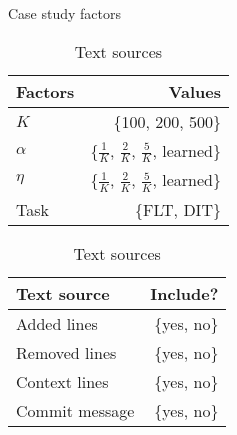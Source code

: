 \begin{table}
\begin{spacing}{1.2}
\centering
\parbox{.45\linewidth}{
\centering
\caption{Case study factors}
\label{table:combo-rq1}
\begin{tabular}{lr}
\toprule
Factors           &  Values  \\
\midrule
$K$             &  \{100, 200, 500\} \\
$\alpha$      &  \{$\frac{1}{K}$, $\frac{2}{K}$, $\frac{5}{K}$, learned\} \\
$\eta$      &  \{$\frac{1}{K}$, $\frac{2}{K}$, $\frac{5}{K}$, learned\} \\
Task      &  \{FLT, DIT\} \\
\bottomrule
\end{tabular}
}
\hfill
\parbox{.45\linewidth}{
\centering
\caption{Text sources}
\vspace{0.2em}
\label{table:combo-rq2}
\begin{tabular}{lr}
\toprule
Text source   &  Include? \\
\midrule
Added lines   &  \{yes, no\} \\
Removed lines   &  \{yes, no\} \\
Context lines   &  \{yes, no\} \\
Commit message   &  \{yes, no\} \\
\bottomrule
\end{tabular}
}
\end{spacing}
\end{table}
